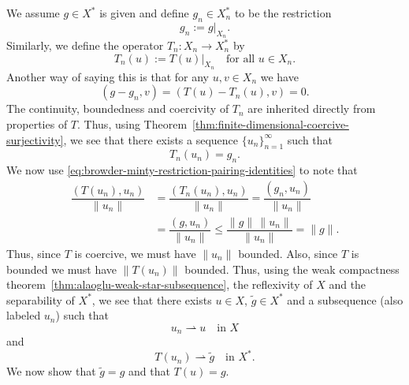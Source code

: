 \begin{Proof}
We assume $g\in X^*$ is given and define $g_n\in X_n^*$ to be the restriction
\begin{equation}\label{eq:browder-minty-restricted-right-hand-side}
g_n:=g|_{X_n}.
\end{equation}
Similarly, we define the operator $T_n:X_n\to X_n^*$ by
\begin{equation}\label{eq:browder-minty-restricted-nonlinear-mapping}
T_n(u):=T(u)|_{X_n}\quad\text{for all }u\in X_n.
\end{equation}
Another way of saying this is that for any $u,v\in X_n$ we have
\begin{equation}\label{eq:browder-minty-restriction-pairing-identities}
(g-g_n,v)=(T(u)-T_n(u),v)=0.
\end{equation}
The continuity, boundedness and coercivity of $T_n$ are inherited directly from properties of $T$. Thus, using Theorem~\ref{thm:finite-dimensional-coercive-surjectivity}, we see that there exists a sequence $\{u_n\}_{n=1}^\infty$ such that
\begin{equation}\label{eq:browder-minty-galerkin-solution-sequence}
T_n(u_n)=g_n.
\end{equation}
We now use \eqref{eq:browder-minty-restriction-pairing-identities} to note that
\begin{equation}\label{eq:browder-minty-coercive-solution-norm-bound}
\begin{aligned}
\dfrac{(T(u_n),u_n)}{\|u_n\|}&=\dfrac{(T_n(u_n),u_n)}{\|u_n\|}=\dfrac{(g_n,u_n)}{\|u_n\|}\\
&=\dfrac{(g,u_n)}{\|u_n\|}\leq\dfrac{\|g\|\,\|u_n\|}{\|u_n\|}=\|g\|.
\end{aligned}
\end{equation}
Thus, since $T$ is coercive, we must have $\|u_n\|$ bounded. Also, since $T$ is bounded we must have $\|T(u_n)\|$ bounded. Thus, using the weak compactness theorem~\ref{thm:alaoglu-weak-star-subsequence}, the reflexivity of $X$ and the separability of $X^*$, we see that there exists $u\in X$, $\widetilde g\in X^*$ and a subsequence (also labeled $u_n$) such that
\begin{equation}\label{eq:browder-minty-galerkin-weak-solution-limit}
u_n\rightharpoonup u\quad\text{in }X
\end{equation}
and
\begin{equation}\label{eq:browder-minty-galerkin-weak-image-limit}
T(u_n)\rightharpoonup\widetilde g\quad\text{in }X^*.
\end{equation}
We now show that $\widetilde g=g$ and that $T(u)=g$.


\end{Proof}
